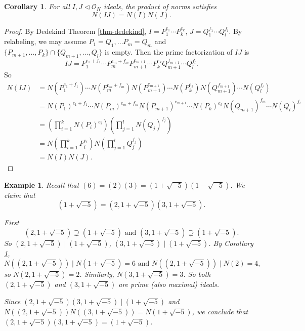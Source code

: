 \documentclass[11pt]{book}
\newtheorem{corollary}[theorem]{Corollary}
\newtheorem{example}[theorem]{Example}
\begin{document}
\begin{corollary}\label{cor-multiplicativityNorm}
    For all $I,J\lhd \mathcal{O}_{K}$ ideals, the product of norms satisfies 
    \[
    N(IJ)=N(I)N(J).
    \]
\end{corollary}

\begin{proof}
    By Dedekind Theorem \ref{thm-dedekind}, $I=P_{1}^{e_{1}}\cdots P_{k}^{e_{k}}$, $J=Q_{1}^{f_{1}}\cdots Q_{l}^{f_{l}}$. By relabeling, we may assume $P_{1}=Q_{1},\dots P_{m}=Q_{m}$ and $\{P_{m+1}, \dots, P_k\} \cap \{Q_{m+1}, \dots, Q_l\}$ is empty. Then the prime factorization of $IJ$ is 
    \[
    IJ=P_{1}^{e_{1}+f_{1}}\cdots P_{m}^{e_{m}+f_{m}}P_{m+1}^{e_{m+1}}\cdots P_{k}^{e_{k}}Q_{m+1}^{f_{m+1}}\cdots Q_{l}^{f_{l}}. 
    \]
    So 
    \[
    \begin{aligned}
        N(IJ)&=N(P_{1}^{e_{1}+f_{1}})\cdots N(P_{m}^{e_{m}+f_{m}})N(P_{m+1}^{e_{m+1}})\cdots N(P_{k}^{e_{k}})N(Q_{m+1}^{f_{m+1}})\cdots N(Q_{l}^{f_{l}})\\
        &=N(P_{1})^{e_{1}+f_{1}}\cdots N(P_{m})^{e_{m}+f_{m}}N(P_{m+1})^{e_{m+1}}\cdots N(P_{k})^{e_{k}}N(Q_{m+1})^{f_{m}}\cdots N(Q_{l})^{f_{l}}\\
        &=(\prod_{i=1}^{k}N(P_{i})^{e_{i}})(\prod_{j=1}^{l}N(Q_{j})^{f_{j}})\\
        &=N(\prod_{i=1}^{k}P_{i}^{e_{i}})N(\prod_{j=1}^{l}Q_{j}^{f_{j}})\\
        &=N(I)N(J). 
    \end{aligned}
    \]
\end{proof}

\begin{example}
    Recall that $(6)=(2)(3)=(1+\sqrt{-5})(1-\sqrt{-5})$. We claim that 
    \[(1+\sqrt{-5})=(2,1+\sqrt{-5})(3,1+\sqrt{-5}).\]

    First 
    \[(2,1+\sqrt{-5})\supsetneq (1+\sqrt{-5}) \text{ and } (3,1+\sqrt{-5})\supsetneq (1+\sqrt{-5}). 
    \]
    So $(2,1+\sqrt{-5})\mid (1+\sqrt{-5})$, $(3,1+\sqrt{-5})\mid (1+\sqrt{-5})$. By Corollary \ref{cor-multiplicativityNorm}, 
    \[N((2,1+\sqrt{-5}))\mid N(1+\sqrt{-5})=6 \text{ and } N((2,1+\sqrt{-5}))\mid N(2)=4,\] 
    so $N(2,1+\sqrt{-5})=2$. Similarly, $N(3,1+\sqrt{-5})=3$. So both $(2,1+\sqrt{-5})$ and $(3,1+\sqrt{-5})$ are prime (also maximal) ideals. 

    Since $(2,1+\sqrt{-5})(3,1+\sqrt{-5})\mid (1+\sqrt{-5})$ and $N((2,1+\sqrt{-5}))N((3,1+\sqrt{-5}))=N(1+\sqrt{-5})$, we conclude that $(2,1+\sqrt{-5})(3,1+\sqrt{-5})=(1+\sqrt{-5})$. 
\end{example}
\end{document}

